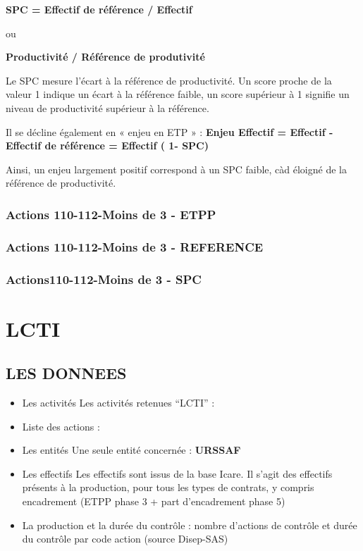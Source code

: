 \documentclass[
]{book}
\begin{document}
\textbf{SPC = Effectif de référence / Effectif}

ou

\textbf{Productivité / Référence de produtivité}

Le SPC mesure l'écart à la référence de productivité. Un score proche de la valeur 1 indique un écart à la référence faible, un score supérieur à 1 signifie un niveau de productivité supérieur à la référence.

Il se décline également en « enjeu en ETP » :
\textbf{Enjeu Effectif = Effectif - Effectif de référence = Effectif ( 1- SPC)}

Ainsi, un enjeu largement positif correspond à un SPC faible, càd éloigné de la référence de productivité.

\hypertarget{actions-110-112-moins-de-3---etpp}{%
\subsection{Actions 110-112-Moins de 3 - ETPP}\label{actions-110-112-moins-de-3---etpp}}

\hypertarget{actions-110-112-moins-de-3---reference}{%
\subsection{Actions 110-112-Moins de 3 - REFERENCE}\label{actions-110-112-moins-de-3---reference}}

\hypertarget{actions110-112-moins-de-3---spc}{%
\subsection{Actions110-112-Moins de 3 - SPC}\label{actions110-112-moins-de-3---spc}}

\hypertarget{lcti}{%
\chapter{LCTI}\label{lcti}}

\hypertarget{les-donnees-2}{%
\section{LES DONNEES}\label{les-donnees-2}}

\begin{itemize}
\item
  Les activités
  Les activités retenues ``LCTI'' :
\item
  Liste des actions :
\item
  Les entités
  Une seule entité concernée : \textbf{URSSAF}
\item
  Les effectifs
  Les effectifs sont issus de la base Icare.
  Il s'agit des effectifs présents à la production, pour tous les types de contrats, y compris encadrement (ETPP phase 3 + part d'encadrement phase 5)
\item
  La production et la durée du contrôle : nombre d'actions de contrôle et durée du contrôle par code action (source Disep-SAS)
\end{itemize}
\end{document}
